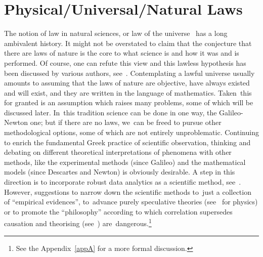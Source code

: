 \documentclass[12pt]{article}
\begin{document}
\section{Physical/Universal/Natural Laws}%

The notion of law in  natural sciences,
or law of  the universe~\cite{Beebee-Hume,sep-kant-hume-causality,Russell-1913-cause,mumford-causation,feynman-law,Norton-2003-cafs} has a long
ambivalent history.
It might not be overstated to claim that
the conjecture
that there are laws of nature is the core to what science is and how it was and is performed.
Of course, one can refute this view and this lawless hypothesis   has been discussed by various authors,
see~\cite{armstrong_1983,vanFraassen1989-VANLAS,calude1999islawful,lawlses_rosen2010,calude2013theeinai,chaos_multiverse2017,Mueller-2017,Cabello-2018-BornRule}.
Contemplating
a lawful universe usually amounts to assuming
that the laws of nature are objective,
have always existed and will exist,
and they are written in the language of mathematics.
Taken~this for granted
is an assumption which raises many problems, some of which will be discussed later.
In~this tradition science can
be done in one way,
the Galileo-Newton one; but if there are no laws,
we~can be freed to pursue  other methodological options, some of which are not entirely unproblematic.
Continuing to enrich
the fundamental Greek practice of scientific observation, thinking and debating on different theoretical interpretations of
phenomena with other  methods, like  the experimental methods (since Galileo) and the mathematical models
(since Descartes and Newton) is obviously desirable.
A step in this direction is to incorporate robust data analytics as a scientific method, see~\cite{miningMD2011,DS2012,doingDS1014,Reed:2015:ECB:2797100.2699414}. However,
suggestions to narrow down the scientific methods to~just a collection of ``empirical evidences'',
to~advance  purely speculative theories (see~\cite{nature_scmeth2014} for physics)
or  to promote the  ``philosophy'' according to which
correlation supersedes causation and theorising (see~\cite{suprious2016}) are~dangerous.\footnote{See the Appendix~\ref{appA} for a more formal discussion.}
\end{document}
